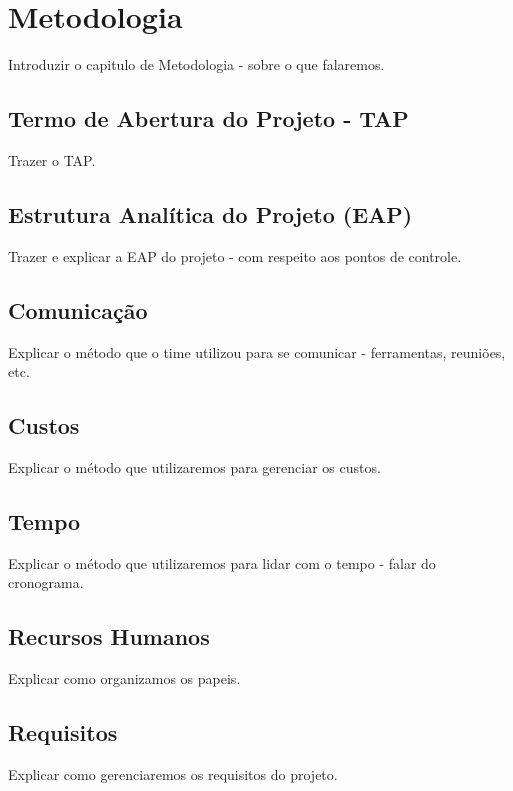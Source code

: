 \chapter{Metodologia}

Introduzir o capitulo de Metodologia - sobre o que falaremos.

\section{Termo de Abertura do Projeto - TAP}

Trazer o TAP.

\section{Estrutura Analítica do Projeto (EAP)}

Trazer e explicar a EAP do projeto - com respeito aos pontos de controle.

\section{Comunicação}

Explicar o método que o time utilizou para se comunicar - ferramentas, reuniões, etc.

\section{Custos}

Explicar o método que utilizaremos para gerenciar os custos.

\section{Tempo}

Explicar o método que utilizaremos para lidar com o tempo - falar do cronograma.

\section{Recursos Humanos}

Explicar como organizamos os papeis.

\section{Requisitos}

Explicar como gerenciaremos os requisitos do projeto.

